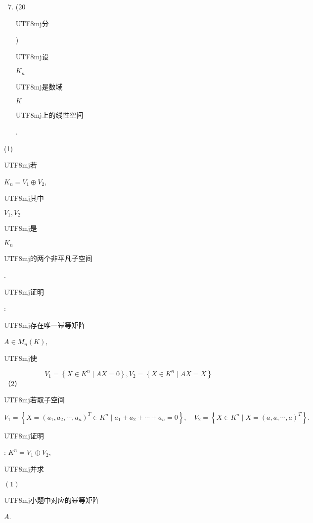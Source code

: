 \documentclass[10pt]{article}
\begin{document}
\begin{enumerate}
  \setcounter{enumi}{6}
  \item (20 \begin{CJK}{UTF8}{mj}分\end{CJK}) \begin{CJK}{UTF8}{mj}设\end{CJK} $K_{n}$ \begin{CJK}{UTF8}{mj}是数域\end{CJK} $K$ \begin{CJK}{UTF8}{mj}上的线性空间\end{CJK}.
\end{enumerate}
(1) \begin{CJK}{UTF8}{mj}若\end{CJK} $K_{n}=V_{1} \oplus V_{2}$, \begin{CJK}{UTF8}{mj}其中\end{CJK} $V_{1}, V_{2}$ \begin{CJK}{UTF8}{mj}是\end{CJK} $K_{n}$ \begin{CJK}{UTF8}{mj}的两个非平凡子空间\end{CJK}. \begin{CJK}{UTF8}{mj}证明\end{CJK}: \begin{CJK}{UTF8}{mj}存在唯一幂等矩阵\end{CJK} $A \in M_{n}(K)$, \begin{CJK}{UTF8}{mj}使\end{CJK}
$$
V_{1}=\left\{X \in K^{n} \mid A X=0\right\}, V_{2}=\left\{X \in K^{n} \mid A X=X\right\}
$$
（2）\begin{CJK}{UTF8}{mj}若取子空间\end{CJK}
$$
V_{1}=\left\{X=\left(a_{1}, a_{2}, \cdots, a_{n}\right)^{T} \in K^{n} \mid a_{1}+a_{2}+\cdots+a_{n}=0\right\}, \quad V_{2}=\left\{X \in K^{n} \mid X=(a, a, \cdots, a)^{T}\right\} .
$$
\begin{CJK}{UTF8}{mj}证明\end{CJK}: $K^{n}=V_{1} \oplus V_{2}$, \begin{CJK}{UTF8}{mj}并求\end{CJK} $(1)$ \begin{CJK}{UTF8}{mj}小题中对应的幂等矩阵\end{CJK} $A$.
\end{document}
